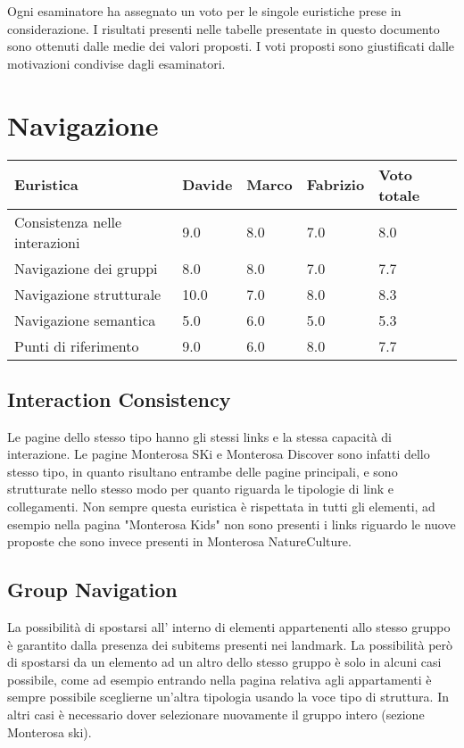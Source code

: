     Ogni esaminatore ha assegnato un voto
    per le singole euristiche prese in considerazione. I risultati presenti
    nelle tabelle presentate in questo documento sono ottenuti dalle medie dei
    valori proposti.
    I voti proposti sono giustificati dalle motivazioni condivise dagli esaminatori.
    \section{Navigazione}
        \begin{table}[H]
        \begin{tabular}{|l|l|l|l|l|}
        \hline \textbf{Euristica} & \textbf{Davide} & \textbf{Marco} & \textbf{Fabrizio} & \textbf{Voto totale} \\ \hline
        Consistenza nelle interazioni & 9.0 & 8.0 & 7.0 & 8.0 \\ \hline
        Navigazione dei gruppi & 8.0 & 8.0 & 7.0 & 7.7 \\ \hline
        Navigazione strutturale & 10.0 & 7.0 & 8.0 & 8.3 \\ \hline
        Navigazione semantica & 5.0 & 6.0 & 5.0 & 5.3 \\ \hline
        Punti di riferimento & 9.0 & 6.0 & 8.0 & 7.7 \\ \hline
        \end{tabular}
        \end{table}
        \subsection{Interaction Consistency}
        Le pagine dello stesso tipo hanno gli stessi links e la stessa capacità
        di interazione. Le pagine Monterosa SKi e Monterosa Discover sono
        infatti dello stesso tipo, in quanto risultano entrambe delle pagine
        principali, e sono strutturate nello stesso modo per quanto riguarda le
        tipologie di link e collegamenti.
        Non sempre questa euristica è rispettata in tutti gli elementi, ad
        esempio nella pagina "Monterosa Kids" non sono presenti i links riguardo
        le nuove proposte che sono invece presenti in Monterosa NatureCulture.
    

        \subsection{Group Navigation}
        La possibilità di spostarsi all’ interno di elementi appartenenti allo
        stesso gruppo è garantito dalla presenza dei subitems presenti nei
        landmark. La possibilità però di spostarsi da un elemento ad un altro
        dello stesso gruppo è solo in alcuni casi possibile, come ad esempio
        entrando nella pagina relativa agli appartamenti è sempre possibile
        sceglierne un'altra tipologia usando la voce tipo di struttura. In altri
        casi è necessario dover selezionare nuovamente il gruppo intero (sezione
        Monterosa ski). 
